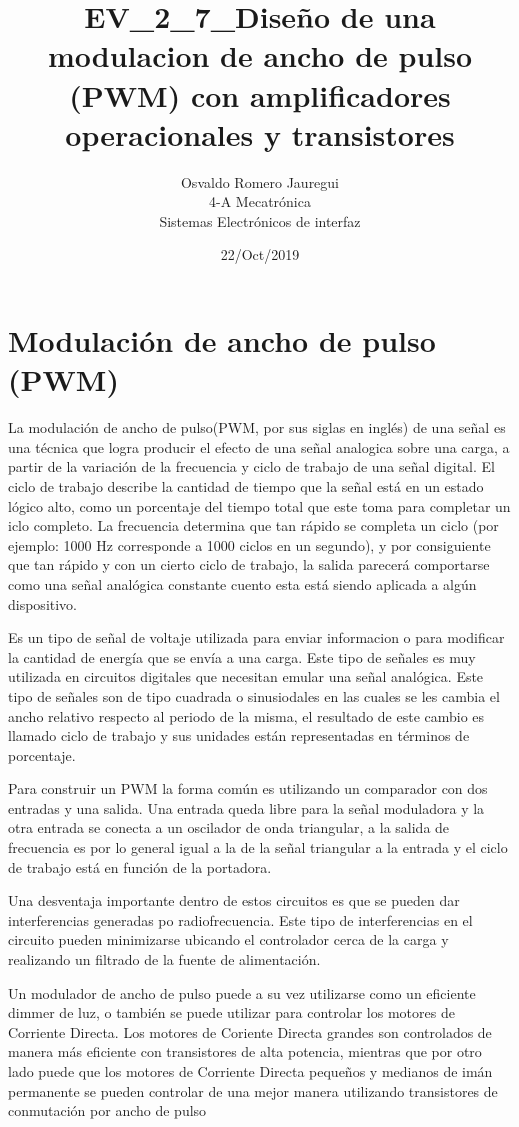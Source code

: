 \documentclass[11pt]{article}
\title{\textbf{EV\_2\_7\_Diseño de una modulacion de ancho de pulso (PWM) con amplificadores operacionales y transistores}}
\author{Osvaldo Romero Jauregui\\
		4-A Mecatrónica\\
		Sistemas Electrónicos de interfaz }
\date{22/Oct/2019}
\begin{document}
\maketitle

\section{Modulación de ancho de pulso (PWM)}
La modulación de ancho de pulso(PWM, por sus siglas en inglés) de una señal es una técnica que logra producir el efecto de una señal analogica sobre una carga, a partir de la variación de la frecuencia y ciclo de trabajo de una señal digital. El ciclo de trabajo describe la cantidad de tiempo que la señal está en un estado lógico alto, como un porcentaje del tiempo total que este toma para completar un iclo completo. La frecuencia determina que tan rápido se completa un ciclo (por ejemplo: 1000 Hz corresponde a 1000 ciclos en un segundo), y por consiguiente que tan rápido y con un cierto ciclo de trabajo, la salida parecerá comportarse como una señal analógica constante cuento esta está siendo aplicada a algún dispositivo.

Es un tipo de señal de voltaje utilizada para enviar informacion o para modificar la cantidad de energía que se envía a una carga. Este tipo de señales es muy utilizada en circuitos digitales que necesitan emular una señal analógica.
Este tipo de señales son de tipo cuadrada o sinusiodales en las cuales se les cambia el ancho relativo respecto al periodo de la misma, el resultado de este cambio es llamado ciclo de trabajo y sus unidades están representadas en términos de porcentaje.

Para construir un PWM la forma común es utilizando un comparador con dos entradas y una salida. Una entrada queda libre para la señal moduladora y la otra entrada se conecta a un oscilador de onda triangular, a la salida de frecuencia es por lo general igual a la de la señal triangular a la entrada y el ciclo de trabajo está en función de la portadora.

Una desventaja importante dentro de estos circuitos es que se pueden dar interferencias generadas po radiofrecuencia. Este tipo de interferencias en el circuito pueden minimizarse ubicando el controlador cerca de la carga y realizando un filtrado de la fuente de alimentación.

Un modulador de ancho de pulso puede a su vez utilizarse como un eficiente dimmer de luz, o también se puede utilizar para controlar los motores de Corriente Directa. Los motores de Coriente Directa grandes son controlados de manera más eficiente con transistores de alta potencia, mientras que por otro lado puede que los motores de Corriente Directa pequeños y medianos de imán permanente se pueden controlar de una mejor manera utilizando transistores de conmutación por ancho de pulso 
\end{document}
